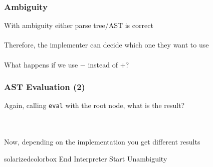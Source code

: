 \documentclass[aspectratio=169]{beamer}
\newenvironment{tikztree}[1][3em]{\begin{center}
\begin{tikzpicture}
  \tikzstyle{every node}=[draw=solarizedAccent, circle,
                           minimum size=#1]}{\end{tikzpicture}
\end{center}}
\begin{document}
\begin{frame}
\frametitle{Ambiguity}

With ambiguity either parse tree/AST is correct\\~\\

Therefore, the implementer can decide which one they want to use\\~\\

What happens if we use $-$ instead of $+$?
\end{frame}

\begin{frame}
\frametitle{AST Evaluation (2)}

Again, calling \lstinline{eval} with the root node, what is the result?

~\\~\\
Now, depending on the implementation you get different results
\end{frame}

\begin{frame}
  \begin{beamercolorbox}[wd=\paperwidth, sep=2em]{solarizedcolorbox}
    { End Interpreter \hfill
      Start Unambiguity}
  \end{beamercolorbox}
\end{frame}
\end{document}
